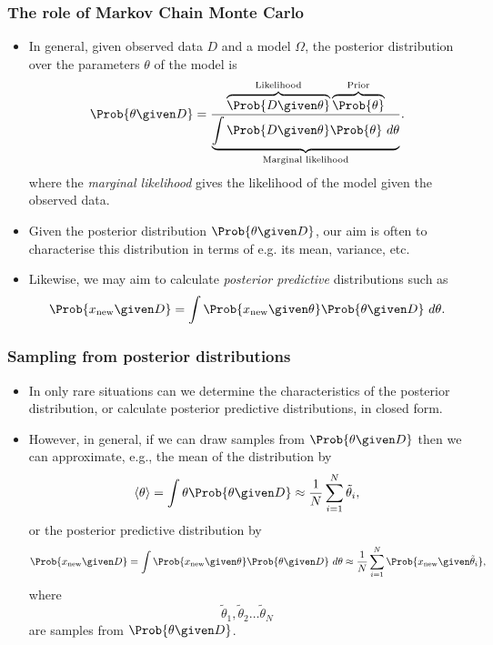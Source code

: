 \documentclass{slides}
\begin{document}
	
\begin{frame}
	\frametitle{The role of Markov Chain Monte Carlo}
	
	\begin{itemize}

		\item In general, given observed data $D$ and a model $\Omega$, the posterior distribution over the parameters $\theta$ of the model is
		\[
			\Prob{\theta\given D}
			= \frac{\overbrace{\Prob{D\given\theta}}^{\text{Likelihood}}\overbrace{\Prob{\theta}}^{\text{Prior}}}
			{\underbrace{\int\Prob{D\given\theta}\Prob{\theta}\ d\theta}_{\text{Marginal likelihood}}}.
		\]
		where the \emph{marginal likelihood} gives the likelihood of the model given the observed data.

	\item Given the posterior distribution $\Prob{\theta\given D}$, our aim is often to characterise this distribution in terms of e.g. its mean, variance, etc. 
	\item Likewise, we may aim to calculate \emph{posterior predictive} distributions such as 
		\[
			\Prob{x_{\text{new}} \given D} = \int\Prob{x_{\text{new}}\given\theta}\Prob{\theta\given D}\ d\theta.
		\]

	\end{itemize}
\end{frame}

\begin{frame}
	\frametitle{Sampling from posterior distributions}
	\begin{itemize}

		\item In only rare situations can we determine the characteristics of the posterior distribution, or calculate posterior predictive distributions, in closed form.
		\item However, in general, if we can draw samples from $\Prob{\theta\given D}$ then we can approximate, e.g., the mean of the distribution by
			\[
				\langle\theta\rangle = \int\theta\Prob{\theta\given D} \approx \frac{1}{N} \sum_{i=1}^N \tilde{\theta}_i,
			\]
		or the posterior predictive distribution by 
		\[
			\Prob{x_{\text{new}} \given D} = \int\Prob{x_{\text{new}}\given\theta}\Prob{\theta\given D}\ d\theta
			\approx \frac{1}{N} \sum_{i=1}^N \Prob{x_{\text{new}}\given\tilde{\theta}_i},
		\]
		where \[\tilde{\theta}_1, \tilde{\theta}_2 \ldots \tilde{\theta}_N\] are samples from $\Prob{\theta\given D}$.
	\end{itemize}
\end{frame}
\end{document}
